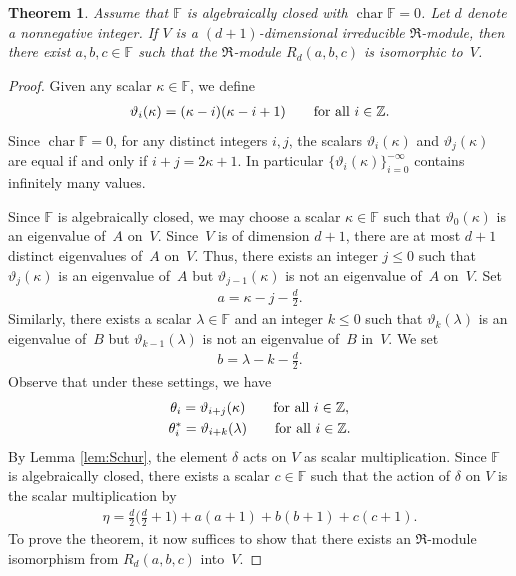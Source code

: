 \documentclass[pdftex]{sigma}
\def\F{\mathbb F}
\def\Z{\mathbb Z}
\numberwithin{equation}{section}
\newtheorem{Theorem}{Theorem}[section]
\begin{document}
\begin{Theorem}\label{thm:surjective}Assume that $\F$ is algebraically closed with $\operatorname{char}\F=0$. Let $d$ denote a nonnegative integer. If $V$ is a $(d + 1)$-dimensional irreducible $\Re$-module, then there exist $a, b, c \in \F$ such that the $\Re$-module $R_d(a, b, c)$ is isomorphic to~$V$.
\end{Theorem}
\begin{proof}Given any scalar $\kappa \in \F$, we define
\begin{gather*}
\vartheta_i(\kappa)
=(\kappa-i)(\kappa-i+1)
\qquad
\hbox{for all $i\in \Z$}.
\end{gather*}
Since $\operatorname{char}\F=0$, for any distinct integers $i,j$, the scalars $\vartheta_i(\kappa)$ and $\vartheta_j(\kappa)$ are equal if and only if $i+j=2\kappa+1$. In particular $\{\vartheta_i(\kappa)\}_{i=0}^{-\infty}$ contains infinitely many values.

Since $\F$ is algebraically closed, we may choose a scalar $\kappa\in \F$ such that $\vartheta_0(\kappa)$ is an eigenvalue of~$A$ on~$V$. Since~$V$ is of dimension $d+1$, there are at most $d+1$ distinct eigenvalues of~$A$ on~$V$. Thus, there exists an integer $j\leq 0$ such that $\vartheta_j(\kappa)$ is an eigenvalue of~$A$ but $\vartheta_{j-1}(\kappa)$ is not an eigenvalue of~$A$ on~$V$. Set
\begin{gather*}
a=\kappa-j-\tfrac{d}{2}.
\end{gather*}
Similarly, there exists a scalar $\lambda\in \F$ and an integer $k\leq 0$ such that $\vartheta_k(\lambda)$ is an eigenvalue of~$B$ but $\vartheta_{k-1}(\lambda)$ is not an eigenvalue of~$B$ in~$V$. We set
\begin{gather*}
b=\lambda-k-\tfrac{d}{2}.
\end{gather*}
Observe that under these settings, we have
\begin{gather}
\theta_i = \vartheta_{i+j}(\kappa) \qquad\hbox{for all $i\in \Z$},\label{setting:a}\\
\theta_i^* = \vartheta_{i+k}(\lambda)\qquad\hbox{for all $i\in \Z$}.\label{setting:b}
\end{gather}
By Lemma \ref{lem:Schur}, the element $\delta$ acts on $V$ as scalar multiplication. Since $\F$ is algebraically closed, there exists a scalar $c\in \F$ such that the action of $\delta$ on $V$ is the scalar multiplication by
\begin{gather*}
\eta=\textstyle\frac{d}{2}\big(\frac{d}{2}+1\big)+a(a+1)+b(b+1)+c(c+1).
\end{gather*}
To prove the theorem, it now suffices to show that there exists an $\Re$-module isomorphism from $R_d(a,b,c)$ into~$V$.


\end{proof}
\end{document}
